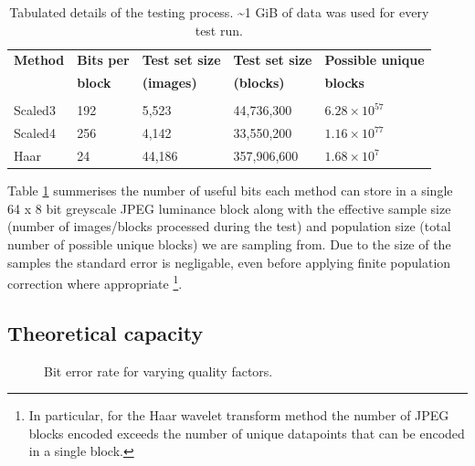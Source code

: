 \begin{table}[tbph]
  \begin{center}
        \begin{tabular}{l l l l l}
        \textbf{Method} &\textbf{Bits per} &\textbf{Test set size} & \textbf{Test set size} &\textbf{Possible unique} \\ 
            &\textbf{block} &\textbf{(images)} &\textbf{(blocks)} &\textbf{blocks} \\ [0.1ex] \hline \\ [-1.5ex]
        Scaled3	&192	&5,523	&44,736,300	& $6.28 \times 10^{57}$ \\
        Scaled4	&256	&4,142	&33,550,200	& $1.16 \times 10^{77}$ \\
        Haar	&24	&44,186	&357,906,600	& $1.68 \times 10^{7}$ \\
        \end{tabular}
        \caption{Tabulated details of the testing process. \textasciitilde 1 GiB of data was used for every test run.}
        \label{tab:img-test}
    \end{center}
\end{table}

Table \ref{tab:img-test} summerises the number of useful bits each method can store in a single 64 x 8 bit greyscale JPEG luminance block along with the effective sample size (number of images/blocks processed during the test) and population size (total number of possible unique blocks) we are sampling from. Due to the size of the samples the standard error is negligable, even before applying finite population correction where appropriate \footnote{In particular, for the Haar wavelet transform method the number of JPEG blocks encoded exceeds the number of unique datapoints that can be encoded in a single block.}. 


\subsection{Theoretical capacity}
\label{ssec:capacity}

\begin{figure}[tbph]
  \begin{center}
    \caption{Bit error rate for varying quality factors.}
    \label{graph:ber}
  \end{center}
\end{figure}

